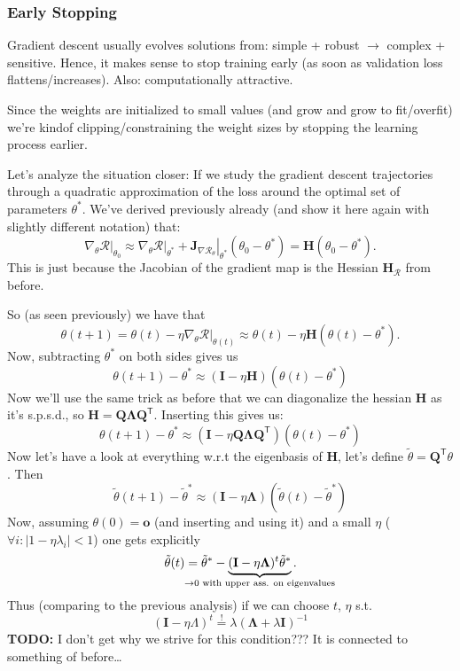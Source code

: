 \documentclass[a2paper,4pt]{extarticle}
\newcommand{\cR}{\mathcal{R}}
\newcommand{\abs}[1]{\left\lvert #1 \right\rvert}
\newcommand*{\T}{\mathsf{T}}
\newcommand{\mbeq}{\stackrel{!}{=}}
\newcommand{\mat}[1]{\mathbf{#1}}
\renewcommand{\vec}[1]{\mathbf{#1}}
\newcommand{\vo}{\vec{o}}
\newcommand{\MH}{\mat{H}}
\newcommand{\MI}{\mat{I}}
\newcommand{\MJ}{\mat{J}}
\newcommand{\MQ}{\mat{Q}}
\newcommand{\MLambda}{\mat{\Lambda}}
\newcommand{\evalat}[2]{\left. #1 \right|_{#2}}
\newcommand{\todo}[1]{\textbf{TODO:} #1}
\newcommand{\todo}[1]{%
}
\begin{document}
\begin{landscape}
\begin{multicols*}{7}
\subsubsection{Early Stopping}

Gradient descent usually evolves solutions from: simple + robust $\to$ complex +
sensitive. Hence, it makes sense to stop training early (as soon as validation
loss flattens/increases). Also: computationally attractive.

Since the weights are initialized to small values (and grow and grow to
fit/overfit) we're kindof clipping/constraining the weight
sizes by stopping the learning process earlier.

Let's analyze the situation closer: If we study the gradient descent
trajectories through a quadratic approximation of the loss around the optimal
set of parameters $\theta^*$. We've derived previously already (and show it
here again with slightly different notation) that:
\[
\evalat{\nabla_{\theta}\cR}{\theta_0}
\approx
\evalat{\nabla_{\theta}\cR}{\theta^*}
+
\evalat{\MJ_{\nabla\cR_{\theta}}}{\theta^*}
(\theta_0-\theta^*)
=
\MH(\theta_0-\theta^*).
\]
This is just because the Jacobian of the gradient map is the Hessian
$\MH_{\cR}$ from before.

So (as seen previously) we have that
\[
\theta(t+1)
=
\theta(t)
-\evalat{\eta
\nabla_{\theta}\cR}{\theta(t)}
\approx
\theta(t)-\eta\MH(\theta(t)-\theta^*).
\]
Now, subtracting $\theta^*$ on both sides gives us
\[
\theta(t+1)-\theta^*\approx
(\MI-\eta\MH)(\theta(t)-\theta^*)
\]
Now we'll use the same trick as before that we can diagonalize the hessian $\MH$
as it's s.p.s.d., so $\MH=\MQ\MLambda\MQ^\T$. Inserting this gives us:
\[
\theta(t+1)-\theta^*\approx
(\MI-\eta\MQ\MLambda\MQ^\T)(\theta(t)-\theta^*)
\]
Now let's have a look at everything w.r.t the eigenbasis of $\MH$, let's define
$\tilde{\theta}=\MQ^\T\theta$. Then
\[
\tilde{\theta}(t+1)-\tilde{\theta}^*\approx
(\MI-\eta\MLambda)(\tilde{\theta}(t)-\tilde{\theta}^*)
\]
Now, assuming $\theta(0)=\vo$ (and inserting and using it) and a small $\eta$
($\forall i\colon \abs{1-\eta\lambda_i}<1$) one gets explicitly
\[
\tilde{\theta}(t)=\tilde{\theta}^* -
\underbrace{(\MI-\eta\MLambda)^t\tilde{\theta}^*}_{\mathclap{\to 0\text{ with
upper ass. on eigenvalues}}}.
\]
Thus (comparing to the previous analysis) if we can choose $t$, $\eta$ s.t.
\[
(\MI-\eta\Lambda)^t\mbeq\lambda(\MLambda+\lambda\MI)^{-1}
\]
\todo{I don't get why we strive for this condition??? It is connected to
something of before\ldots}


\end{multicols*}
\end{landscape}
\end{document}
